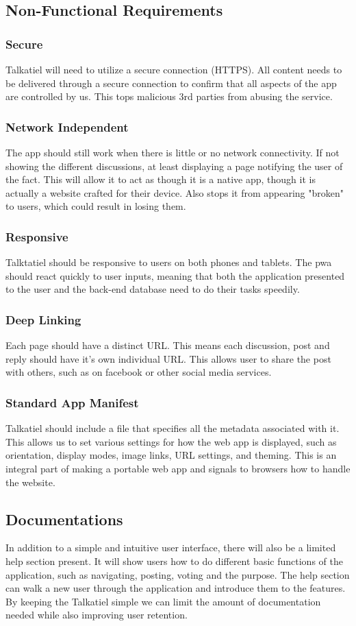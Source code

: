 \documentclass[12pt]{article}
\begin{document}
\subsection{Non-Functional Requirements}
\subsubsection{Secure}
Talkatiel will need to utilize a secure connection (HTTPS).
All content needs to be delivered through a secure connection to confirm that all aspects of the app are controlled by us.  This tops malicious 3rd parties from abusing the service.
\subsubsection{Network Independent}
The app should still work when there is little or no network connectivity.
If not showing the different discussions, at least displaying a page notifying the user of the fact.  This will allow it to act as though it is a native app, though it is actually a website crafted for their device.  Also stops it from appearing "broken" to users, which could result in losing them.
\subsubsection{Responsive}
Talktatiel should be responsive to users on both phones and tablets.  The pwa should react quickly to user inputs, meaning that both the application presented to the user and the back-end database need to do their tasks speedily.
\subsubsection{Deep Linking}
Each page should have a distinct URL.  This means each discussion, post and reply should have it's own individual URL.  This allows user to share the post with others, such as on facebook or other social media services.
\subsubsection{Standard App Manifest}
Talkatiel should include a file that specifies all the metadata associated with it.
This allows us to set various settings for how the web app is displayed, such as orientation, display modes, image links, URL settings, and theming.  This is an integral part of making a portable web app and signals to browsers how to handle the website.
\subsection{Documentations}
In addition to a simple and intuitive user interface, there will also be a limited help section present.  It will show users how to do different basic functions of the application, such as navigating, posting, voting and the purpose.  The help section can walk a new user through the application and introduce them to the features.  By keeping the Talkatiel simple we can limit the amount of documentation needed while also improving user retention.
\end{document}
